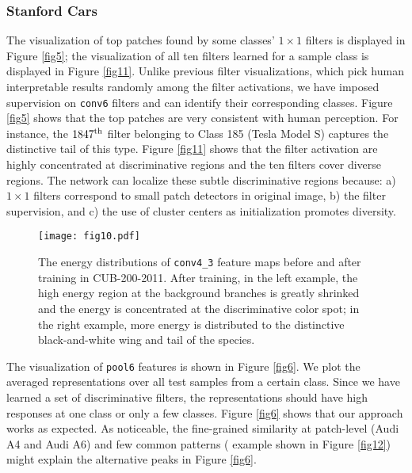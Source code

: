 \documentclass[10pt,twocolumn,letterpaper]{article}
\begin{document}
\subsubsection{Stanford Cars} \label{sec4_4_2}
The visualization of top patches found by some classes' $1\times1$ filters is displayed in Figure \ref{fig5}; the
visualization of all ten filters learned for a sample class is displayed in Figure \ref{fig11}. Unlike
previous filter visualizations, which pick human interpretable results randomly among the filter activations, we have
imposed supervision on \texttt{conv6} filters and can identify their corresponding classes. Figure
\ref{fig5} shows that the top patches are very consistent with human perception.
For instance, the $1847^{\rm th}$ filter belonging to
Class 185 (Tesla Model S) captures the distinctive tail of this type. Figure \ref{fig11} shows that the filter
activation are highly concentrated at discriminative regions and the ten filters cover diverse regions.
The network can localize these subtle discriminative regions because:
a) $1\times1$ filters correspond to small patch detectors in original image, b) the filter supervision, and c) the
use of cluster centers as initialization promotes diversity.
\begin{figure}
\begin{center}
\texttt{[image: fig10.pdf]}
\end{center}
   \vspace{-10pt}
   \caption{\label{fig10}The energy distributions of \texttt{conv4\_3} feature maps before and after training in
   CUB-200-2011. After training, in the left example, the high energy region at the background branches is greatly
   shrinked and the energy is concentrated at the discriminative color spot; in the right example, more energy is distributed to the
   distinctive black-and-white wing and tail of the species.}
   \vspace{-10pt}
\end{figure}

The visualization of \texttt{pool6} features is shown in Figure \ref{fig6}. We plot the averaged representations over all
test samples from a certain class. Since we have learned a set of discriminative filters, the representations
should have high responses at one class or only a few classes. Figure \ref{fig6} shows that our approach works as
expected. As noticeable, the fine-grained similarity at patch-level (\eg Audi A4 and Audi A6) and few common patterns (
example shown in Figure \ref{fig12}) might explain the alternative peaks in Figure \ref{fig6}.
\end{document}
